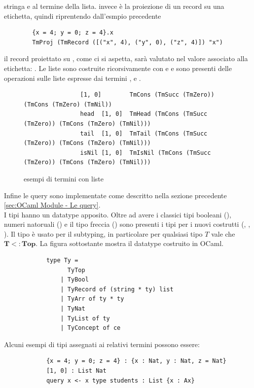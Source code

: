         stringa e al termine della lista.  invece è la proiezione di un record su una etichetta, quindi riprentendo dall'esmpio precedente 
        \begin{verbatim}
        {x = 4; y = 0; z = 4}.x 
        TmProj (TmRecord ([("x", 4), ("y", 0), ("z", 4)]) "x")
        \end{verbatim}
        il record proiettato su , come ci si aspetta, sarà valutato nel valore associato alla etichetta: .
        Le liste sono costruite ricorsivamente con  e  e sono presenti delle operazioni sulle liste espresse dai termini ,
         e .
        \begin{figure}[h]
            \begin{verbatim}
                [1, 0]        TmCons (TmSucc (TmZero)) (TmCons (TmZero) (TmNil))
                head  [1, 0]  TmHead (TmCons (TmSucc (TmZero)) (TmCons (TmZero) (TmNil)))
                tail  [1, 0]  TmTail (TmCons (TmSucc (TmZero)) (TmCons (TmZero) (TmNil)))
                isNil [1, 0]  TmIsNil (TmCons (TmSucc (TmZero)) (TmCons (TmZero) (TmNil)))
            \end{verbatim}
        \caption{esempi di termini con liste}
        \end{figure}
        Infine le query sono implementate come descritto nella sezione precedente \ref{sec:OCaml Module - Le query}.
        \\I tipi hanno un datatype apposito. Oltre ad avere i classici tipi booleani (), numeri natoruali () e il tipo freccia () 
        sono presenti i tipi per i nuovi costrutti (, , ). Il tipo  è usato per il subtyping, in particolare per
        qualsiasi tipo $T$ vale che $\boldsymbol{T <: Top}$. La figura sottostante mostra il datatype costruito in OCaml.
        \begin{verbatim}
            type Ty =
                  TyTop 
                | TyBool 
                | TyRecord of (string * ty) list 
                | TyArr of ty * ty 
                | TyNat 
                | TyList of ty
                | TyConcept of ce
        \end{verbatim}
        Alcuni esempi di tipi assegnati ai relativi termini possono essere:
        \begin{verbatim}
            {x = 4; y = 0; z = 4} : {x : Nat, y : Nat, z = Nat}
            [1, 0] : List Nat
            query x <- x type students : List {x : Ax}
        \end{verbatim}
